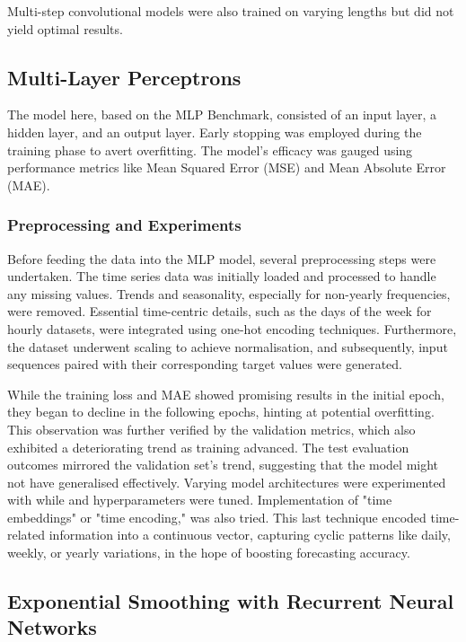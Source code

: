 \documentclass[conference]{IEEEtran}
\begin{document}
Multi-step convolutional models were also trained on varying lengths but did not yield optimal results.

\subsection{Multi-Layer Perceptrons}

The model here, based on the MLP Benchmark\cite{mlp}, consisted of an input layer, a hidden layer, and an output layer. Early stopping was employed during the training phase to avert overfitting. The model's efficacy was gauged using performance metrics like Mean Squared Error (MSE) and Mean Absolute Error (MAE).

\subsubsection{Preprocessing and Experiments}

Before feeding the data into the MLP model, several preprocessing steps were undertaken. The time series data was initially loaded and processed to handle any missing values. Trends and seasonality, especially for non-yearly frequencies, were removed. Essential time-centric details, such as the days of the week for hourly datasets, were integrated using one-hot encoding techniques. Furthermore, the dataset underwent scaling to achieve normalisation, and subsequently, input sequences paired with their corresponding target values were generated.

While the training loss and MAE showed promising results in the initial epoch, they began to decline in the following epochs, hinting at potential overfitting. This observation was further verified by the validation metrics, which also exhibited a deteriorating trend as training advanced. The test evaluation outcomes mirrored the validation set's trend, suggesting that the model might not have generalised effectively. Varying model architectures were experimented with while and hyperparameters were tuned. Implementation of "time embeddings" or "time encoding," was also tried. This last technique encoded time-related information into a continuous vector, capturing cyclic patterns like daily, weekly, or yearly variations, in the hope of boosting forecasting accuracy.

\subsection{Exponential Smoothing with Recurrent Neural Networks}
\end{document}
